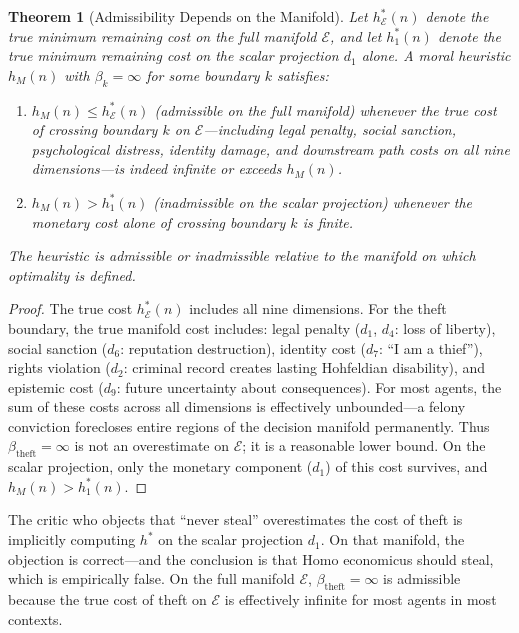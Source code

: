 \documentclass[12pt]{article}
\newtheorem{theorem}{Theorem}[section]
\theoremstyle{definition}
\theoremstyle{remark}
\newcommand{\E}{\mathcal{E}}               %
\begin{document}
\begin{theorem}[Admissibility Depends on the Manifold]
\label{thm:admissibility_manifold}
Let $h^*_\E(n)$ denote the true minimum remaining cost on the full manifold $\E$, and let $h^*_1(n)$ denote the true minimum remaining cost on the scalar projection $d_1$ alone.  A moral heuristic $h_M(n)$ with $\beta_k = \infty$ for some boundary $k$ satisfies:
\begin{enumerate}
    \item $h_M(n) \leq h^*_\E(n)$ (admissible on the full manifold) whenever the true cost of crossing boundary $k$ on $\E$---including legal penalty, social sanction, psychological distress, identity damage, and downstream path costs on all nine dimensions---is indeed infinite or exceeds $h_M(n)$.
    \item $h_M(n) > h^*_1(n)$ (inadmissible on the scalar projection) whenever the monetary cost alone of crossing boundary $k$ is finite.
\end{enumerate}
The heuristic is admissible or inadmissible \emph{relative to the manifold on which optimality is defined}.
\end{theorem}

\begin{proof}
The true cost $h^*_\E(n)$ includes all nine dimensions.  For the theft boundary, the true manifold cost includes: legal penalty ($d_1$, $d_4$: loss of liberty), social sanction ($d_6$: reputation destruction), identity cost ($d_7$: ``I am a thief''), rights violation ($d_2$: criminal record creates lasting Hohfeldian disability), and epistemic cost ($d_9$: future uncertainty about consequences).  For most agents, the sum of these costs across all dimensions is effectively unbounded---a felony conviction forecloses entire regions of the decision manifold permanently.  Thus $\beta_{\text{theft}} = \infty$ is not an overestimate on $\E$; it is a reasonable lower bound.  On the scalar projection, only the monetary component ($d_1$) of this cost survives, and $h_M(n) > h^*_1(n)$.
\end{proof}

The critic who objects that ``never steal'' overestimates the cost of theft is implicitly computing $h^*$ on the scalar projection $d_1$.  On that manifold, the objection is correct---and the conclusion is that Homo economicus should steal, which is empirically false.  On the full manifold $\E$, $\beta_{\text{theft}} = \infty$ is admissible because the true cost of theft on $\E$ is effectively infinite for most agents in most contexts.
\end{document}
